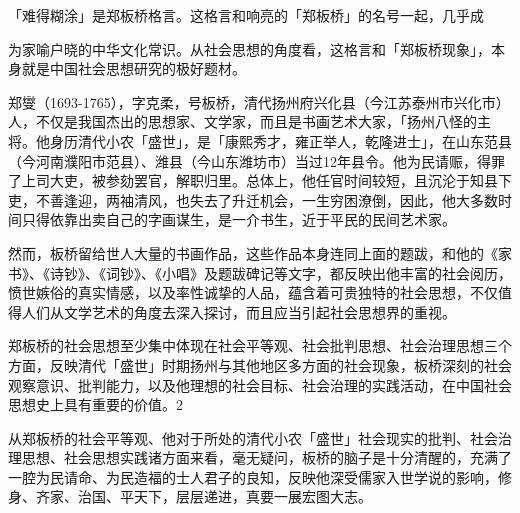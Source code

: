 \begin{BookQuote}
「难得糊涂」是郑板桥格言。这格言和响亮的「郑板桥」的名号一起，几乎成
\end{BookQuote}

为家喻户晓的中华文化常识。从社会思想的角度看，这格言和「郑板桥现象」，本身就是中国社会思想研究的极好题材。

郑燮（1693-1765），字克柔，号板桥，清代扬州府兴化县（今江苏泰州市兴化市）人，不仅是我国杰出的思想家、文学家，而且是书画艺术大家，「扬州八怪的主将。他身历清代小农「盛世」，是「康熙秀才，雍正举人，乾隆进士」，在山东范县（今河南濮阳市范县）、潍县（今山东潍坊市）当过12年县令。他为民请赈，得罪了上司大吏，被参劾罢官，解职归里。总体上，他任官时间较短，且沉沦于知县下吏，不善逢迎，两袖清风，也失去了升迁机会，一生穷困潦倒，因此，他大多数时间只得依靠出卖自己的字画谋生，是一介书生，近于平民的民间艺术家。

然而，板桥留给世人大量的书画作品，这些作品本身连同上面的题跋，和他的《家书》、《诗钞》、《词钞》、《小唱》及题跋碑记等文字，都反映出他丰富的社会阅历，愤世嫉俗的真实情感，以及率性诚挚的人品，蕴含着可贵独特的社会思想，不仅值得人们从文学艺术的角度去深入探讨，而且应当引起社会思想界的重视。

\vfill
\begin{BookNotes}
\end{BookNotes}

郑板桥的社会思想至少集中体现在社会平等观、社会批判思想、社会治理思想三个方面，反映清代「盛世」时期扬州与其他地区多方面的社会现象，板桥深刻的社会观察意识、批判能力，以及他理想的社会目标、社会治理的实践活动，在中国社会思想史上具有重要的价值。2

从郑板桥的社会平等观、他对于所处的清代小农「盛世」社会现实的批判、社会治理思想、社会思想实践诸方面来看，毫无疑问，板桥的脑子是十分清醒的，充满了一腔为民请命、为民造福的士人君子的良知，反映他深受儒家入世学说的影响，修身、齐家、治国、平天下，层层递进，真要一展宏图大志。

